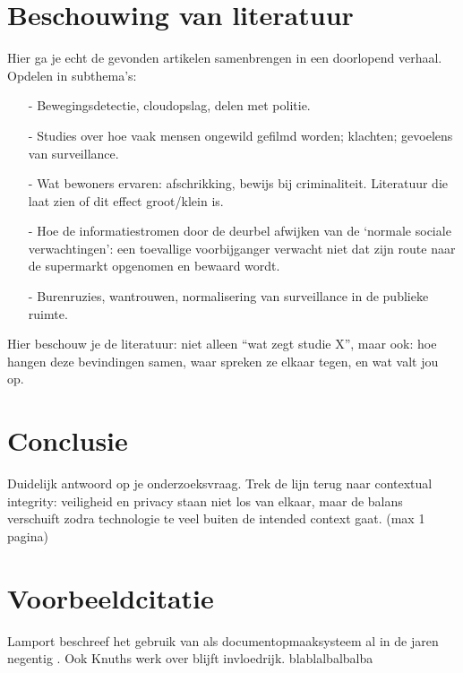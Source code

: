\documentclass[nonacm,sigconf]{acmart}
\begin{document}
    \section{Beschouwing van literatuur}
    Hier ga je echt de gevonden artikelen samenbrengen in een doorlopend verhaal.
    Opdelen in subthema’s:

    \begin{itemize}[leftmargin = *,listparindent =1cm]
        \item[-] Bewegingsdetectie, cloudopslag, delen met politie.
        \item[-] Studies over hoe vaak mensen ongewild gefilmd worden; klachten; gevoelens van surveillance.
        \item[-] Wat bewoners ervaren: afschrikking, bewijs bij criminaliteit. Literatuur die laat zien of dit effect groot/klein is.
        \item[-] Hoe de informatiestromen door de deurbel afwijken van de ‘normale sociale verwachtingen’: een toevallige voorbijganger verwacht niet dat zijn route naar de supermarkt opgenomen en bewaard wordt.
        \item[-] Burenruzies, wantrouwen, normalisering van surveillance in de publieke ruimte.
    \end{itemize}

    Hier beschouw je de literatuur: niet alleen “wat zegt studie X”, maar ook: hoe hangen deze bevindingen samen, waar spreken ze elkaar tegen, en wat valt jou op.

    \section{Conclusie}
    Duidelijk antwoord op je onderzoeksvraag.
    Trek de lijn terug naar contextual integrity: veiligheid en privacy staan niet los van elkaar, maar de balans verschuift zodra technologie te veel buiten de intended context gaat. (max 1 pagina)

    \section{Voorbeeldcitatie}
    Lamport beschreef het gebruik van als documentopmaaksysteem al in de jaren negentig \parencite{tabassum2023exploring}.
    Ook Knuths werk over blijft invloedrijk. \parencite{chaudhari2020smart}
    blablalbalbalba \parencite{kelly2023ring}

    \printbibliography

    \balance %
\end{document}
